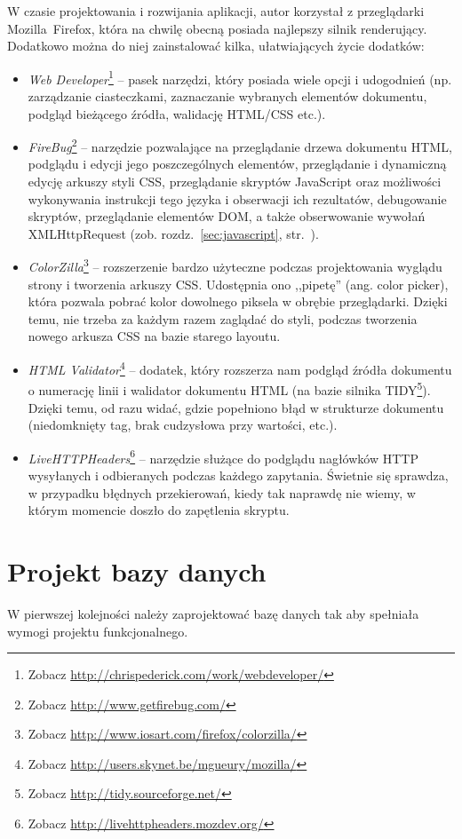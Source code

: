 \documentclass[a4paper,12pt,oneside]{report}
\begin{document}
W czasie projektowania i rozwijania aplikacji, autor korzystał z przeglądarki Mozilla~Firefox, która na chwilę obecną posiada najlepszy silnik renderujący. Dodatkowo można do niej zainstalować kilka, ułatwiających życie dodatków:
\begin{itemize}
  \item \emph{Web Developer}\footnote{Zobacz \url{http://chrispederick.com/work/webdeveloper/}} -- pasek narzędzi, który posiada wiele opcji i udogodnień (np. zarządzanie ciasteczkami, zaznaczanie wybranych elementów dokumentu, podgląd bieżącego źródła, walidację HTML/CSS etc.).
  \item \emph{FireBug}\footnote{Zobacz \url{http://www.getfirebug.com/}} -- narzędzie pozwalające na przeglądanie drzewa dokumentu HTML, podglądu i edycji jego poszczególnych elementów, przeglądanie i dynamiczną edycję arkuszy styli CSS, przeglądanie skryptów JavaScript oraz możliwości wykonywania instrukcji tego języka i obserwacji ich rezultatów, debugowanie skryptów, przeglądanie elementów DOM, a także obserwowanie wywołań XMLHttpRequest (zob. rozdz.~\ref{sec:javascript}, str.~\pageref{sec:javascript}).
  \item \emph{ColorZilla}\footnote{Zobacz \url{http://www.iosart.com/firefox/colorzilla/}} -- rozszerzenie bardzo użyteczne podczas projektowania wyglądu strony i tworzenia arkuszy CSS. Udostępnia ono ,,pipetę'' (ang. color picker), która pozwala pobrać kolor dowolnego piksela w obrębie przeglądarki. Dzięki temu, nie trzeba za każdym razem zaglądać do styli, podczas tworzenia nowego arkusza CSS na bazie starego layoutu.
  \item \emph{HTML Validator}\footnote{Zobacz \url{http://users.skynet.be/mgueury/mozilla/}} -- dodatek, który rozszerza nam podgląd źródła dokumentu o numerację linii i walidator dokumentu HTML (na bazie silnika TIDY\footnote{Zobacz \url{http://tidy.sourceforge.net/}}). Dzięki temu, od razu widać, gdzie popełniono błąd w strukturze dokumentu (niedomknięty tag, brak cudzysłowa przy wartości, etc.).
  \item \emph{LiveHTTPHeaders}\footnote{Zobacz \url{http://livehttpheaders.mozdev.org/}} -- narzędzie służące do podglądu nagłówków HTTP wysyłanych i odbieranych podczas każdego zapytania. Świetnie się sprawdza, w przypadku błędnych przekierowań, kiedy tak naprawdę nie wiemy, w którym momencie doszło do zapętlenia skryptu.
\end{itemize}

\section{Projekt bazy danych}
\label{sec:db-projekt}
W pierwszej kolejności należy zaprojektować bazę danych tak aby spełniała wymogi projektu funkcjonalnego.
\end{document}

